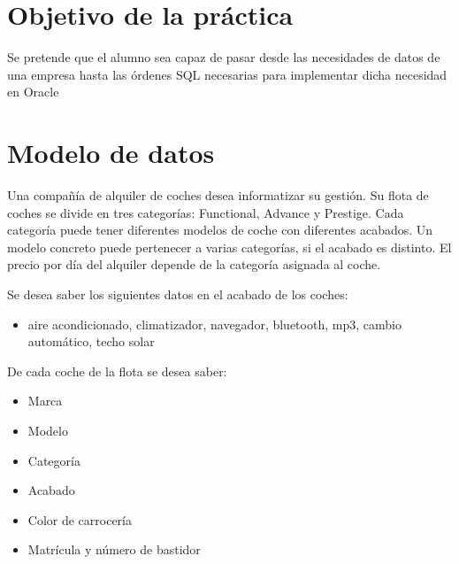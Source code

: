
\usepackage{eurosym}





\renewcommand{\hmwkTitle}{Diseño E/R, paso a SQL e inserción de datos}


\usepackage{blindtext}






\primerapagina

\setlength{\parindent}{2em}
\setlength{\parskip}{1em}

\section{Objetivo de la práctica}
Se pretende que el alumno sea capaz de pasar desde las necesidades de datos de una empresa hasta las órdenes SQL necesarias para implementar dicha necesidad en Oracle

\section{Modelo de datos}
Una compañía de alquiler de coches desea informatizar su gestión.
Su flota de coches se divide en tres categorías: Functional, Advance y
Prestige. Cada categoría puede tener diferentes modelos de coche
con diferentes acabados. Un modelo concreto puede pertenecer a
varias categorías, si el acabado es distinto. El precio por día del
alquiler depende de la categoría asignada al coche.

Se desea saber los siguientes datos en el acabado de los coches:
\begin{itemize}
\item aire acondicionado, climatizador, navegador, bluetooth, mp3,
  cambio automático, techo solar
\end{itemize}

De cada coche de la flota se desea saber:
\begin{itemize}
\item Marca
\item Modelo
\item Categoría
\item Acabado
\item Color de carrocería
\item Matrícula y número de bastidor
\end{itemize}

